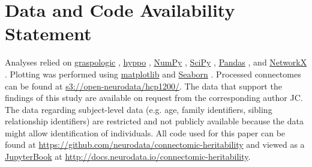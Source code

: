 \section{Data and Code Availability Statement}
Analyses relied on 
\href{https://github.com/microsoft/graspologic}{graspologic} \cite{chung2019graspy}, 
\href{https://github.com/neurodata/hyppo}{hyppo} \cite{panda2021hyppo}, 
\href{https://github.com/numpy/numpy}{NumPy} \cite{harris_array_2020}, 
\href{https://github.com/scipy/scipy}{SciPy} \cite{virtanen_scipy_2020}, 
\href{https://github.com/pandas-dev/pandas}{Pandas} \cite{mckinney_pandas_2011},  
and \href{https://github.com/networkx/networkx}{NetworkX} \cite{hagberg_exploring_2008}. Plotting was performed using \href{https://github.com/matplotlib/matplotlib}{matplotlib} 
\cite{hunter_matplotlib_2007} 
and \href{https://github.com/mwaskom/seaborn}{Seaborn} \cite{seaborn}. 
Processed connectomes can be found at \url{s3://open-neurodata/hcp1200/}.
The data that support the findings of this study are available on request from the corresponding author JC. The data regarding subject-level data (e.g. age, family identifiers, sibling relationship identifiers) are restricted and not publicly available because the data might allow identification of individuals. 
All code used for this paper can be found at \url{https://github.com/neurodata/connectomic-heritability} and viewed as a \href{https://jupyterbook.org/}{JupyterBook} \cite{executable_books_community_2020_4539666} at \url{http://docs.neurodata.io/connectomic-heritability}.
